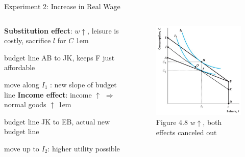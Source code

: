 \documentclass[11pt,aspectratio=43]{beamer}
\let\olditemize=\itemize
\let\endolditemize=\enditemize
\renewenvironment{itemize}{\olditemize \itemsep1em}{\endolditemize}
\theoremstyle{definition}
\begin{document}
\begin{frame}{Experiment 2: Increase in Real Wage}
\label{slide:Experiment_2__Increase_in_Real_Wage}

    \begin{columns}
        \begin{column}{0.5\textwidth}
            \textbf{Substitution effect}: $ w \uparrow  $, leisure is costly, sacrifice $ l $ for $ C $
            \begin{itemize}
                \item budget line AB to JK, keeps F just affordable
                \item move along $ I_{1} $ : new slope of budget line
            \end{itemize}
            \textbf{Income effect}: income $ \uparrow  $ $ \Rightarrow  $ normal goods $ \uparrow  $
            \begin{itemize}
                \item budget line JK to EB, actual new budget line
                \item move up to $ I_{2} $: higher utility possible
            \end{itemize}
        \end{column}
        \begin{column}{0.5\textwidth}
            \begin{figure}
                \caption{Figure 4.8  $w \uparrow $, both effects canceled out}
                \includegraphics[width=\textwidth]{./figures/Figure4_8.jpg}
            \end{figure}
        \end{column}
    \end{columns}

\end{frame}
\end{document}
